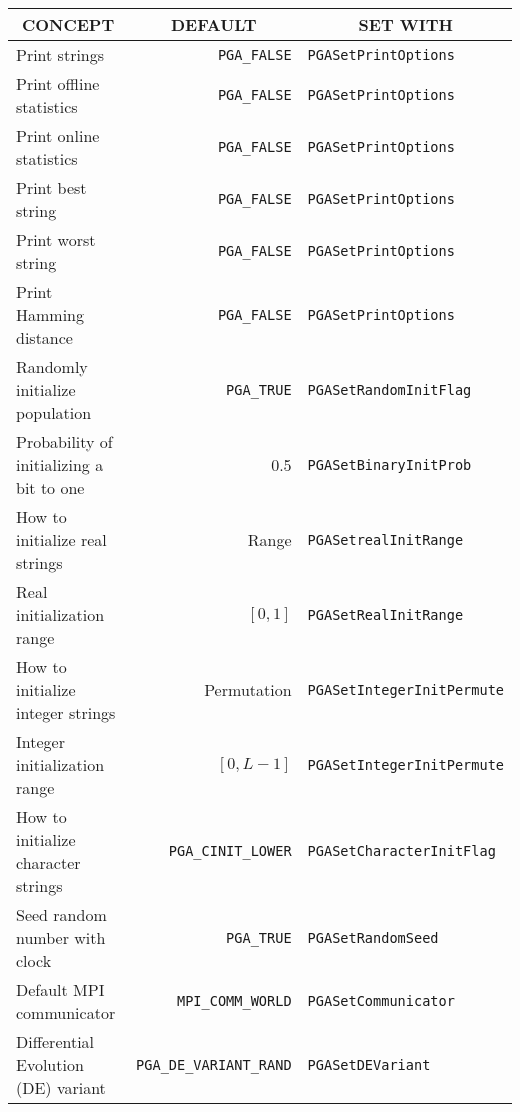 \documentclass{report}
\begin{document}
\begin{table}[htb]
\centering
\begin{tabular}{|l|r|l|} \hline
\multicolumn{1}{|c|}{CONCEPT} &
\multicolumn{1}{c|}{DEFAULT} &
\multicolumn{1}{c|}{SET WITH}  \\  \hline
Print strings
 &  \verb+PGA_FALSE+            & \verb+PGASetPrintOptions+             \\ \hline
Print offline statistics
 &  \verb+PGA_FALSE+            & \verb+PGASetPrintOptions+             \\ \hline
Print online statistics
 &  \verb+PGA_FALSE+            & \verb+PGASetPrintOptions+             \\ \hline
Print best string
 &  \verb+PGA_FALSE+            & \verb+PGASetPrintOptions+             \\ \hline
Print worst string
 &  \verb+PGA_FALSE+            & \verb+PGASetPrintOptions+             \\ \hline
Print Hamming distance
 &  \verb+PGA_FALSE+            & \verb+PGASetPrintOptions+             \\ \hline
Randomly initialize population
 &  \verb+PGA_TRUE+             & \verb+PGASetRandomInitFlag+           \\ \hline
Probability of initializing a bit to one
 & 0.5                          & \verb+PGASetBinaryInitProb+           \\ \hline
How to initialize real strings
 & Range                        & \verb+PGASetrealInitRange+            \\ \hline
Real initialization range
 & $[0,1]$                      & \verb+PGASetRealInitRange+            \\ \hline
How to initialize integer strings
 & Permutation                  & \verb+PGASetIntegerInitPermute+       \\ \hline
Integer initialization range
 & $[0,L-1]$                    & \verb+PGASetIntegerInitPermute+       \\ \hline
How to initialize character strings
 & \verb+PGA_CINIT_LOWER+       & \verb+PGASetCharacterInitFlag+        \\ \hline
Seed random number with clock
 & \verb+PGA_TRUE+              & \verb+PGASetRandomSeed+               \\ \hline
Default MPI communicator
 & \verb+MPI_COMM_WORLD+        & \verb+PGASetCommunicator+             \\ \hline
Differential Evolution (DE) variant
 & \verb+PGA_DE_VARIANT_RAND+   & \verb+PGASetDEVariant+                \\ \hline

\end{tabular}
\end{table}
\end{document}
